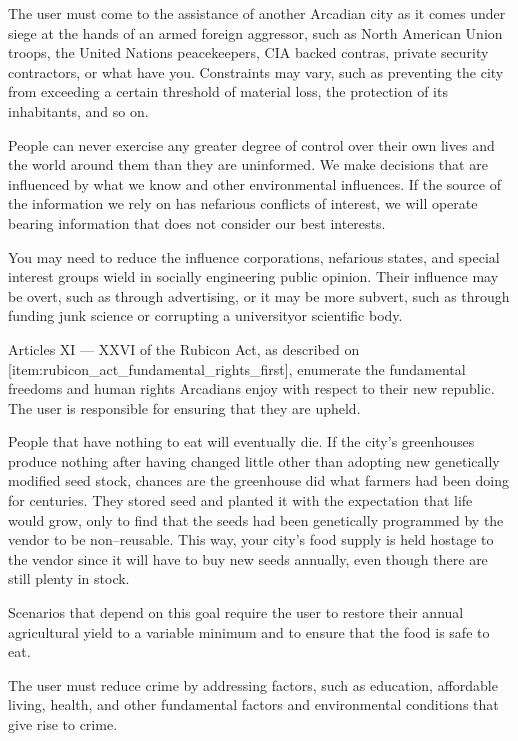 
The user must come to the assistance of another Arcadian city as it comes under siege at the hands of an armed foreign aggressor, such as North American Union troops, the United Nations peacekeepers, CIA backed contras, private security contractors, or what have you. Constraints may vary, such as preventing the city from exceeding a certain threshold of material loss, the protection of its inhabitants, and so on.


People can never exercise any greater degree of control over their own lives and the world around them than they are uninformed. We make decisions that are influenced by what we know and other environmental influences. If the source of the information we rely on has nefarious conflicts of interest, we will operate bearing information that does not consider our best interests.

You may need to reduce the influence corporations, nefarious states, and special interest groups wield in socially engineering public opinion. Their influence may be overt, such as through advertising, or it may be more subvert, such as through funding junk science or corrupting a university\footnotecite[annett2006] or scientific body.


Articles XI --- XXVI of the Rubicon Act, as described on [item:rubicon_act_fundamental_rights_first], enumerate the fundamental freedoms and human rights Arcadians enjoy with respect to their new republic. The user is responsible for ensuring that they are upheld.


People that have nothing to eat will eventually die. If the city's greenhouses produce nothing after having changed little other than adopting new genetically modified seed stock, chances are the greenhouse did what farmers had been doing for centuries. They stored seed and planted it with the expectation that life would grow, only to find that the seeds had been genetically programmed by the vendor to be non--reusable. This way, your city's food supply is held hostage to the vendor since it will have to buy new seeds annually, even though there are still plenty in stock.

Scenarios that depend on this goal require the user to restore their annual agricultural yield to a variable minimum and to ensure that the food is safe to eat.


The user must reduce crime by addressing factors, such as education, affordable living, health, and other fundamental factors and environmental conditions that give rise to crime.

